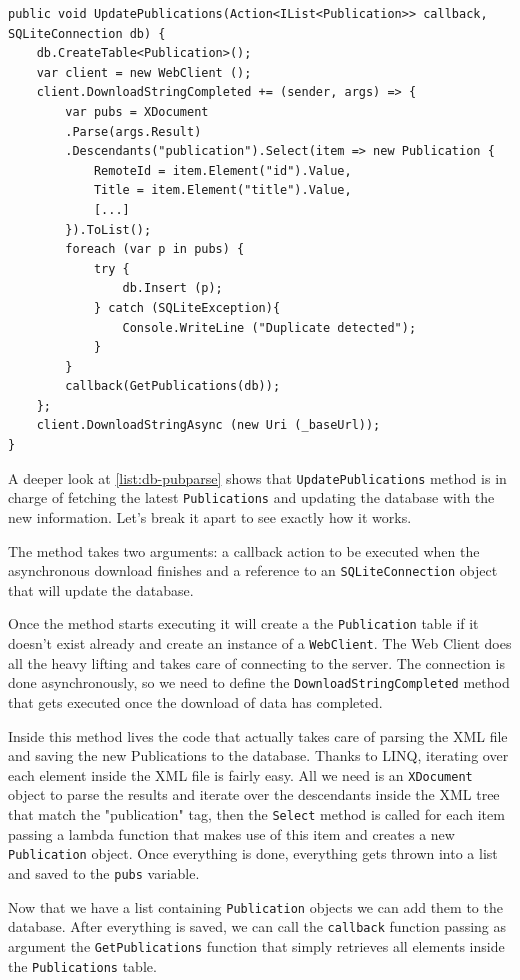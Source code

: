 \begin{lstlisting}[frame=lt,caption=PublicationsParser.cs, label={list:db-pubparse}]
public void UpdatePublications(Action<IList<Publication>> callback, SQLiteConnection db) {
	db.CreateTable<Publication>();
	var client = new WebClient ();
	client.DownloadStringCompleted += (sender, args) => {
		var pubs = XDocument
		.Parse(args.Result)
		.Descendants("publication").Select(item => new Publication {
			RemoteId = item.Element("id").Value,
			Title = item.Element("title").Value,
			[...]
		}).ToList();
		foreach (var p in pubs) {
			try {
				db.Insert (p);
			} catch (SQLiteException){
				Console.WriteLine ("Duplicate detected");
			}				
		}
		callback(GetPublications(db));
	};
	client.DownloadStringAsync (new Uri (_baseUrl));
}
\end{lstlisting}

A deeper look at \autoref{list:db-pubparse} shows that \texttt{UpdatePublications} method is in charge of fetching the latest \texttt{Publications} and updating the database with the new information. Let's break it apart to see exactly how it works.

The method takes two arguments: a callback action to be executed when the asynchronous download finishes and a reference to an \texttt{SQLiteConnection} object that will update the database.

Once the method starts executing it will create a the \texttt{Publication} table if it doesn't exist already and create an instance of a \texttt{WebClient}. The Web Client does all the heavy lifting and takes care of connecting to the server. The connection is done asynchronously, so we need to define the \texttt{DownloadStringCompleted} method that gets executed once the download of data has completed.

Inside this method lives the code that actually takes care of parsing the \ac{XML} file and saving the new Publications to the database. Thanks to \ac{LINQ}, iterating over each element inside the \ac{XML} file is fairly easy. All we need is an \texttt{XDocument} object to parse the results and iterate over the descendants inside the \ac{XML} tree that match the "publication" tag, then the \texttt{Select} method is called for each item passing a lambda function that makes use of this item and creates a new \texttt{Publication} object. Once everything is done, everything gets thrown into a list and saved to the \texttt{pubs} variable. 

Now that we have a list containing \texttt{Publication} objects we can add them to the database. After everything is saved, we can call the \texttt{callback} function passing as argument the \texttt{GetPublications} function that simply retrieves all elements inside the \texttt{Publications} table.

